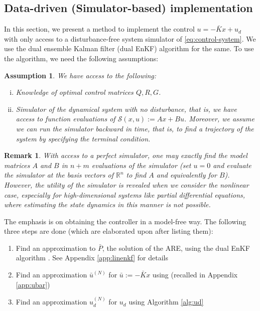 \documentclass[10pt,a4paper]{amsart}
\newtheorem{assumption}{Assumption}
\newtheorem{remark}{Remark}
\newcommand{\R}{\mathbb{R}}
\renewcommand{\S}{\mathcal{S}}
\newcommand{\todo}[1]{{\color{blue} #1}}
\begin{document}
\subsection{Data-driven (Simulator-based) implementation}
In this section, we present a method to implement the control $u = -\bar{K}x + u_d$ with only access to a disturbance-free system simulator of \eqref{eq:control-system}. We use the dual ensemble Kalman filter (dual EnKF) algorithm \cite{joshi-2022} for the same. To use the algorithm, we need the following assumptions:
\begin{assumption}
We have access to the following:
\begin{enumerate}[(i)]
\item Knowledge of optimal control matrices $Q,R,G$. %
\item Simulator of the dynamical system with no disturbance, that is, we have access to function evaluations of $\S(x,u) := Ax + Bu$. Moreover, we assume we can run the simulator backward in time, that is, to find a trajectory of the system by specifying the terminal condition. 
\end{enumerate}
\label{assn:access}
\end{assumption}
\begin{remark}
\label{rmk:evaluate}
With access to a perfect simulator, one may exactly find the model matrices $A$ and $B$ in $n+m$ evaluations of the simulator (set $u=0$ and evaluate the simulator at the basis vectors of $\R^n$ to find $A$ and equivalently for $B$). However, the utility of the simulator is revealed when we consider the nonlinear case, especially for high-dimensional systems like partial differential equations, where estimating the state dynamics in this manner is not possible. 
\end{remark}


The emphasis is on obtaining the controller in a model-free way. The following three steps are done (which are elaborated upon after listing them):
\begin{enumerate}
\item Find an approximation to $\bar{P}$, the solution of the ARE, using the dual EnKF algorithm \cite{joshi-2022}. See Appendix \ref{app:linenkf} for details
\item Find an approximation $\bar{u}^{(N)}$ for $\bar{u} := -\bar{K}x$ using \cite[Algorithm 2]{joshi-2022} (recalled in Appendix \ref{app:ubar})
\item Find an approximation $u_d^{(N)}$ for $u_d$ using Algorithm \ref{alg:ud}
\end{enumerate}
\end{document}
